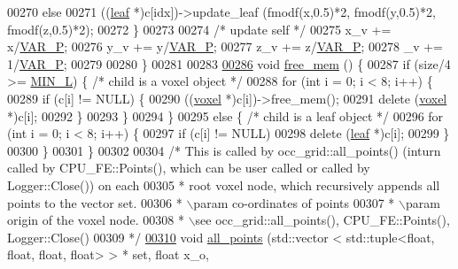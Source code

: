 \begin{DoxyCode}
00270             \textcolor{keywordflow}{else}
00271                 ((\hyperlink{classleaf}{leaf} *)c[idx])->update\_leaf (fmodf(x,0.5)*2, fmodf(y,0.5)*2, fmodf(z,0.5)*2);
00272         \}
00273 
00274         \textcolor{comment}{/* update self */}
00275         x\_v += x/\hyperlink{Voxel_8hpp_ae1cd6283839fc3aebf9bccbd1044a365}{VAR\_P};
00276         y\_v += y/\hyperlink{Voxel_8hpp_ae1cd6283839fc3aebf9bccbd1044a365}{VAR\_P};
00277         z\_v += z/\hyperlink{Voxel_8hpp_ae1cd6283839fc3aebf9bccbd1044a365}{VAR\_P};
00278         \_v += 1/\hyperlink{Voxel_8hpp_ae1cd6283839fc3aebf9bccbd1044a365}{VAR\_P};
00279 
00280     \}
00281 
00283 
\hypertarget{Voxel_8hpp_source.tex_l00286}{}\hyperlink{classvoxel_ac766278266424ede18f1fae9ccfd88be}{00286}     \textcolor{keywordtype}{void} \hyperlink{classvoxel_ac766278266424ede18f1fae9ccfd88be}{free\_mem} () \{
00287         \textcolor{keywordflow}{if} (size/4 >= \hyperlink{Voxel_8hpp_a29d8f4bb35f9fa62e1d680bc6ab1f4f1}{MIN\_L}) \{ \textcolor{comment}{/* child is a voxel object */}
00288             \textcolor{keywordflow}{for} (\textcolor{keywordtype}{int} i = 0; i < 8; i++) \{
00289                 \textcolor{keywordflow}{if} (c[i] != NULL) \{
00290                     ((\hyperlink{classvoxel}{voxel} *)c[i])->free\_mem();
00291                     \textcolor{keyword}{delete} (\hyperlink{classvoxel}{voxel} *)c[i];
00292                 \}
00293             \}
00294         \}
00295         \textcolor{keywordflow}{else} \{ \textcolor{comment}{/* child is a leaf object */}
00296             \textcolor{keywordflow}{for} (\textcolor{keywordtype}{int} i = 0; i < 8; i++) \{
00297                 \textcolor{keywordflow}{if} (c[i] != NULL)
00298                     \textcolor{keyword}{delete} (\hyperlink{classleaf}{leaf} *)c[i];
00299             \}
00300         \}
00301     \}
00302 
00304     \textcolor{comment}{/*  This is called by occ\_grid::all\_points() (inturn called by CPU\_FE::Points(), which can be user
       called or called by Logger::Close()) on each}
00305 \textcolor{comment}{    *   root voxel node, which recursively appends all points to the vector set.}
00306 \textcolor{comment}{    *   \(\backslash\)param co-ordinates of points}
00307 \textcolor{comment}{    *   \(\backslash\)param origin of the voxel node.}
00308 \textcolor{comment}{    *   \(\backslash\)see occ\_grid::all\_points(), CPU\_FE::Points(), Logger::Close()}
00309 \textcolor{comment}{    */}
\hypertarget{Voxel_8hpp_source.tex_l00310}{}\hyperlink{classvoxel_aaea83372a2e28b25ae65dcc635ebe635}{00310}     \textcolor{keywordtype}{void} \hyperlink{classvoxel_aaea83372a2e28b25ae65dcc635ebe635}{all\_points} (std::vector < std::tuple<float, float, float, float> > * \textcolor{keyword}{set}, \textcolor{keywordtype}{float} x\_o, \textcolor{keywordtype}{
}
\end{DoxyCode}
